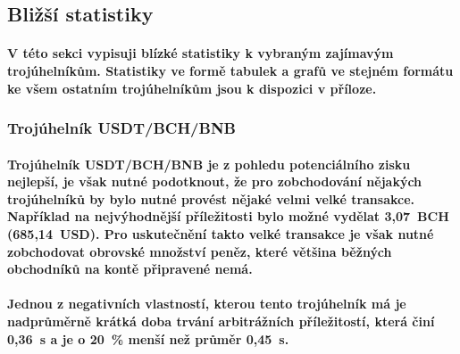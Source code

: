 \documentclass[thesis=B,czech]{FITthesis}[2019/03/21]
\begin{document}
\subsection{Bližší statistiky}
\paragraph{
V této sekci vypisuji blízké statistiky k vybraným zajímavým trojúhelníkům. Statistiky ve formě tabulek a grafů ve stejném formátu ke všem ostatním trojúhelníkům jsou k dispozici v příloze.
}
\subsubsection{Trojúhelník USDT/BCH/BNB}
\paragraph{
Trojúhelník USDT/BCH/BNB je z pohledu potenciálního zisku nejlepší, je však nutné podotknout, že pro zobchodování nějakých trojúhelníků by bylo nutné provést nějaké velmi velké transakce. Například na nejvýhodnější příležitosti bylo možné vydělat 3,07~BCH (685,14~USD). Pro uskutečnění takto velké transakce je však nutné zobchodovat obrovské množství peněz, které většina běžných obchodníků na kontě připravené nemá.
}
\paragraph{
Jednou z negativních vlastností, kterou tento trojúhelník má je nadprůměrně krátká doba trvání arbitrážních příležitostí, která činí 0,36~s a je o 20~\% menší než průměr 0,45~s.
}
\end{document}
